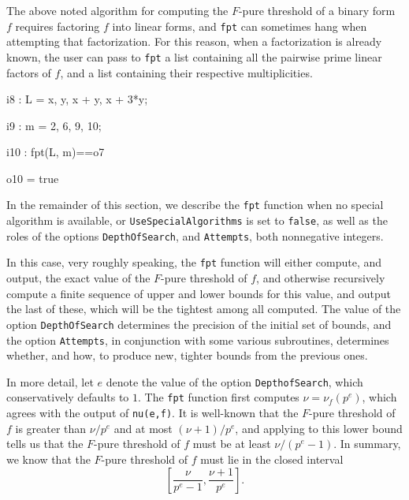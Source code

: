 \documentclass{amsart}
\begin{document}
            The above noted algorithm for computing the $F$-pure threshold of a binary form $f$ requires factoring $f$ into linear forms, and {\tt fpt} can sometimes hang when attempting that factorization. For this reason, when a factorization is already known, the user can pass to {\tt fpt} a list containing all the pairwise prime linear factors of $f$, and a list containing their respective multiplicities.

{\small
{}
\begin{MyVerbatim}

i8 : L = {x, y, x + y, x + 3*y};

i9 : m = {2, 6, 9, 10};

i10 : fpt(L, m)==o7

o10 = true

\end{MyVerbatim}
}

In the remainder of this section, we describe the {\tt fpt} function when no special algorithm is available, or {\tt UseSpecialAlgorithms} is set to {\tt false},  as well as the roles of the options {\tt DepthOfSearch}, and {\tt Attempts}, both nonnegative integers.  

In this case, very roughly speaking, the {\tt fpt} function will either compute, and output, the exact value of the $F$-pure threshold of $f$, and otherwise recursively compute a finite sequence of upper and lower bounds for this value, and output the last of these, which will be the tightest among all computed.  The value of the option {\tt DepthOfSearch} determines the precision of the initial set of bounds, and the option {\tt Attempts}, in conjunction with some various subroutines, determines whether, and how, to produce new, tighter bounds from the previous ones.  %

In more detail, let $e$ denote the value of the option {\tt DepthofSearch}, which conservatively defaults to $1$.  The {\tt fpt} function first computes $\nu=\nu_f(p^e)$, which agrees with the output of {\tt nu(e,f)}.  It is well-known that the $F$-pure threshold of $f$ is greater than $\nu/p^e$ and at most $(\nu+1)/p^e$, and applying  \cite[Proposition 4.2]{HernandezFPurityOfHypersurfaces} to this lower bound tells us that the $F$-pure threshold of $f$ must be at least $\nu/(p^e-1)$.  In summary, we know that the $F$-pure threshold of $f$ must lie in the closed interval 
%
\begin{equation}
\label{estimating-interval: e}
\tag{$\dagger$}
\left[ \frac{\nu}{p^e-1}, \frac{\nu+1}{p^e} \right].
\end{equation}
\end{document}
